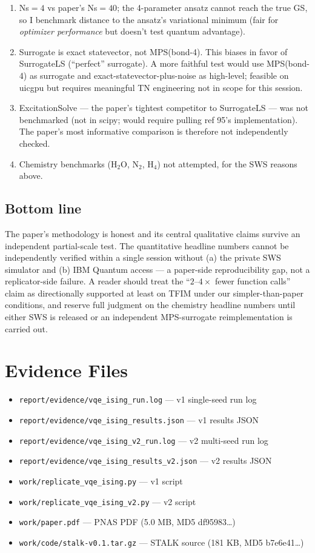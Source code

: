 \documentclass[11pt]{article}
\begin{document}
\begin{enumerate}
  \item Ns$=4$ vs paper's Ns$=40$; the 4-parameter ansatz cannot reach the true GS,
        so I benchmark distance to the ansatz's variational minimum (fair for
        \emph{optimizer performance} but doesn't test quantum advantage).
  \item Surrogate is exact statevector, not MPS(bond-4). This biases in favor of
        SurrogateLS (``perfect'' surrogate). A more faithful test would use MPS(bond-4)
        as surrogate and exact-statevector-plus-noise as high-level; feasible on
        uicgpu but requires meaningful TN engineering not in scope for this session.
  \item ExcitationSolve --- the paper's tightest competitor to SurrogateLS --- was
        not benchmarked (not in scipy; would require pulling ref 95's implementation).
        The paper's most informative comparison is therefore not independently
        checked.
  \item Chemistry benchmarks (H$_2$O, N$_2$, H$_4$) not attempted, for the SWS
        reasons above.
\end{enumerate}

\subsection{Bottom line}

The paper's methodology is honest and its central qualitative claims survive an
independent partial-scale test. The quantitative headline numbers cannot be
independently verified within a single session without (a) the private SWS simulator
and (b) IBM Quantum access --- a paper-side reproducibility gap, not a replicator-side
failure. A reader should treat the ``$2$--$4\times$ fewer function calls'' claim as
directionally supported at least on TFIM under our simpler-than-paper conditions,
and reserve full judgment on the chemistry headline numbers until either SWS is
released or an independent MPS-surrogate reimplementation is carried out.

\section*{Evidence Files}
\begin{itemize}
  \item \texttt{report/evidence/vqe\_ising\_run.log} --- v1 single-seed run log
  \item \texttt{report/evidence/vqe\_ising\_results.json} --- v1 results JSON
  \item \texttt{report/evidence/vqe\_ising\_v2\_run.log} --- v2 multi-seed run log
  \item \texttt{report/evidence/vqe\_ising\_results\_v2.json} --- v2 results JSON
  \item \texttt{work/replicate\_vqe\_ising.py} --- v1 script
  \item \texttt{work/replicate\_vqe\_ising\_v2.py} --- v2 script
  \item \texttt{work/paper.pdf} --- PNAS PDF (5.0 MB, MD5 df95983\ldots)
  \item \texttt{work/code/stalk-v0.1.tar.gz} --- STALK source (181 KB, MD5 b7e6e41\ldots)
\end{itemize}
\end{document}
